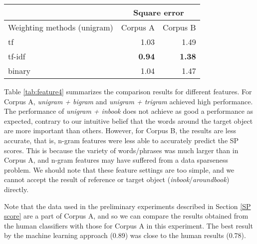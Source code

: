 \documentclass[japanese]{jnlp_1.3d}
\begin{document}
\begin{table}[t]
	\label{tab:feature3}
	  \begin{center}
  \begin{tabular}{|l|rr|} \hline
            & \multicolumn{2}{|c|}{Square error}\\ \hline
    Weighting methods (unigram) & Corpus A & Corpus B\\ \hline
    tf      &   1.03 & 1.49 \\
	tf-idf  &   \textbf{0.94} & \textbf{1.38} \\
	binary  &   1.04 & 1.47 \\ \hline
	\end{tabular}
	\end{center}
\end{table}

Table \ref{tab:feature4} summarizes the comparison results for different features. For Corpus A, \textit{unigram + bigram} and \textit{unigram + trigram} achieved high performance. The performance of \textit{unigram + inbook} does not achieve as good a performance as expected, contrary to our intuitive belief that the words around the target object are more important than others. However, for Corpus B, the results are less accurate, that is, n-gram features were less able to accurately predict the SP scores. This is because the variety of words/phrases was much larger than in Corpus A, and n-gram features may have suffered from a data sparseness problem. We should note that these feature settings are too simple, and we cannot accept the result of reference or target object (\textit{inbook}/\textit{aroundbook}) directly.

Note that the data used in the preliminary experiments described in Section \ref{SP score} are a part of Corpus A, and so we can compare the results obtained from the human classifiers with those for Corpus A in this experiment. The best result by the machine learning approach (0.89) was close to the human results (0.78). 
\end{document}
